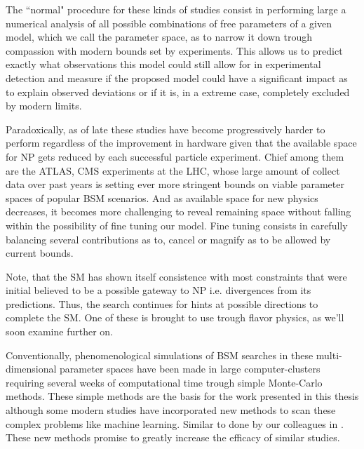 The ``normal" procedure for these kinds of studies consist in performing large a numerical analysis of all possible combinations of free parameters of a given model, which we call the parameter space, as to narrow it down trough compassion with modern bounds set by experiments. This allows us to predict exactly what observations this model could still allow for in experimental detection and measure if the proposed model could have a significant impact as to explain observed deviations or if it is, in a extreme case, completely excluded by modern limits.   
%

Paradoxically, as of late these studies have become progressively harder to perform regardless of the improvement in hardware given that the available space for NP gets reduced by each successful particle experiment. 
%
Chief among them are the ATLAS, CMS experiments at the LHC, whose large amount of collect data over past years is setting ever more stringent bounds on viable parameter spaces of popular BSM scenarios. 
%
And as available space for new physics decreases, it becomes more challenging to reveal remaining space without falling within the possibility of fine tuning our model. Fine tuning consists in carefully balancing several contributions as to, cancel or magnify as to be allowed by current bounds.    


Note, that the SM has shown itself consistence with most constraints that were initial believed to be a possible gateway to NP i.e. divergences from its predictions. Thus, the search continues for hints at possible directions to complete the SM. One of these is brought to use trough flavor physics, as we'll soon examine further on. 

Conventionally, phenomenological simulations of BSM searches in these multi-dimensional parameter spaces have been made in large computer-clusters requiring several weeks of computational time trough simple Monte-Carlo methods. 
%
These simple methods are the basis for the work presented in this thesis although some modern studies have incorporated new methods to scan these complex problems like machine learning. Similar to done by our colleagues in \cite{freitas2020phenomenology}. These new methods promise to greatly increase the efficacy of similar studies.  
%
%

